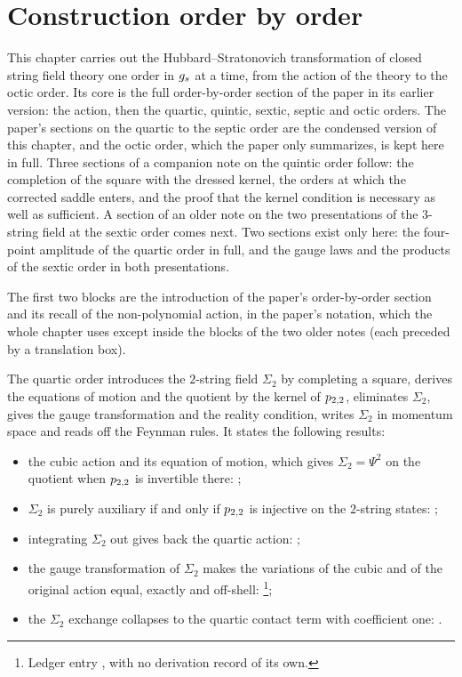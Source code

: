 \section{Construction order by order}
\label{ch:order-by-order}

This chapter carries out the Hubbard--Stratonovich transformation of closed string field theory one order in $g_s$ at a time, from the action of the theory to the octic order.
Its core is the full order-by-order section of the paper in its earlier version: the action, then the quartic, quintic, sextic, septic and octic orders.
The paper's sections on the quartic to the septic order are the condensed version of this chapter, and the octic order, which the paper only summarizes, is kept here in full.
Three sections of a companion note on the quintic order follow: the completion of the square with the dressed kernel, the orders at which the corrected saddle enters, and the proof that the kernel condition is necessary as well as sufficient.
A section of an older note on the two presentations of the $3$-string field at the sextic order comes next.
Two sections exist only here: the four-point amplitude of the quartic order in full, and the gauge laws and the products of the sextic order in both presentations.

\medskip

The first two blocks are the introduction of the paper's order-by-order section and its recall of the non-polynomial action, in the paper's notation, which the whole chapter uses except inside the blocks of the two older notes (each preceded by a translation box).




The quartic order introduces the $2$-string field $\Sigma_2$ by completing a square, derives the equations of motion and the quotient by the kernel of $p_{2,2}$, eliminates $\Sigma_2$, gives the gauge transformation and the reality condition, writes $\Sigma_2$ in momentum space and reads off the Feynman rules.
It states the following results:
\begin{itemize}
  \item the cubic action and its equation of motion, which gives $\Sigma_2 = \Psi^2$ on the quotient when $p_{2,2}$ is invertible there: ;
  \item $\Sigma_2$ is purely auxiliary if and only if $p_{2,2}$ is injective on the $2$-string states: ;
  \item integrating $\Sigma_2$ out gives back the quartic action: ;
  \item the gauge transformation of $\Sigma_2$ makes the variations of the cubic and of the original action equal, exactly and off-shell: \footnote{Ledger entry , with no derivation record of its own.};
  \item the $\Sigma_2$ exchange collapses to the quartic contact term with coefficient one: .
\end{itemize}

